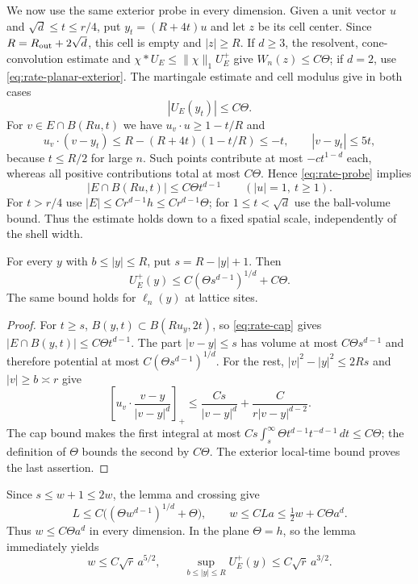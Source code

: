 We now use the same exterior probe in every dimension. Given a unit
vector $u$ and $\sqrt d\le t\le r/4$, put $y_t=(R+4t)u$ and let $z$
be its cell center. Since $R=R_{\rm out}+2\sqrt d$, this cell is empty
and $|z|\ge R$. If $d\ge3$, the resolvent, cone-convolution estimate
and $\chi*U_E\le\|\chi\|_1U_E^+$ give $W_n(z)\le C\Theta$;
if $d=2$, use \eqref{eq:rate-planar-exterior}.
The martingale estimate and cell modulus give in both cases
\begin{equation}\label{eq:rate-probe}
 |U_E(y_t)|\le C\Theta.
\end{equation}
For $v\in E\cap B(Ru,t)$ we have $u_v\cdot u\ge1-t/R$ and
\[
 u_v\cdot(v-y_t)\le R-(R+4t)(1-t/R)\le-t,
 \qquad |v-y_t|\le5t,
\]
because $t\le R/2$ for large $n$. Such points contribute at most
$-ct^{1-d}$ each, whereas all positive contributions total at most
$C\Theta$. Hence \eqref{eq:rate-probe} implies
\begin{equation}\label{eq:rate-cap}
 |E\cap B(Ru,t)|\le C\Theta t^{d-1}\qquad(|u|=1,\ t\ge1).
\end{equation}
For $t>r/4$ use $|E|\le Cr^{d-1}h\le Cr^{d-1}\Theta$;
for $1\le t<\sqrt d$ use the ball-volume bound. Thus the estimate
holds down to a fixed spatial scale, independently of the shell width.

\begin{lemma}\label{lem:rate-near-far}
For every $y$ with $b\le|y|\le R$, put $s=R-|y|+1$. Then
\[
 U_E^+(y)\le C(\Theta s^{d-1})^{1/d}+C\Theta.
\]
The same bound holds for $\ell_n(y)$ at lattice sites.
\end{lemma}
\begin{proof}
For $t\ge s$, $B(y,t)\subset B(Ru_y,2t)$, so
\eqref{eq:rate-cap} gives $|E\cap B(y,t)|\le C\Theta t^{d-1}$.
The part $|v-y|\le s$ has volume at most $C\Theta s^{d-1}$ and
therefore potential at most $C(\Theta s^{d-1})^{1/d}$.
For the rest, $|v|^2-|y|^2\le2Rs$ and $|v|\ge b\asymp r$ give
\[
 \left[u_v\cdot\frac{v-y}{|v-y|^d}\right]_+
 \le\frac{Cs}{|v-y|^d}+\frac{C}{r|v-y|^{d-2}}.
\]
The cap bound makes the first integral at most
$Cs\int_s^\infty\Theta t^{d-1}t^{-d-1}\,dt\le C\Theta$;
the definition of $\Theta$ bounds the second by $C\Theta$.
The exterior local-time bound proves the last assertion.
\end{proof}

Since $s\le w+1\le2w$, the lemma and crossing give
\begin{equation}\label{eq:rate-L}
 L\le C\bigl((\Theta w^{d-1})^{1/d}+\Theta\bigr),
 \qquad w\le CLa\le\tfrac12w+C\Theta a^d.
\end{equation}
Thus $w\le C\Theta a^d$ in every dimension. In the plane $\Theta=h$,
so the lemma immediately yields
\begin{equation}\label{eq:rate-planar-final}
 w\le C\sqrt r\,a^{5/2},\qquad
 \sup_{b\le|y|\le R}U_E^+(y)\le C\sqrt r\,a^{3/2}.
\end{equation}

